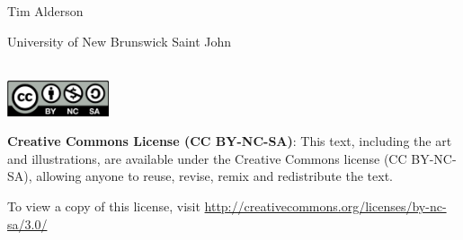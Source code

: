 \vspace{5em}

\noindent Tim Alderson

\noindent University of New Brunswick Saint John

\vfill


 \\

\noindent \includegraphics[width=3cm]{images/cc-by-nc-sa.eps}

\medskip

\noindent \textbf{Creative Commons License (CC BY-NC-SA)}: This text, including the art and illustrations, are available under the Creative Commons license (CC BY-NC-SA), allowing anyone to reuse, revise, remix and redistribute the text.  

\medskip

\noindent To view a copy of this license,
visit \href{http://creativecommons.org/licenses/by-nc-sa/3.0/}{http://creativecommons.org/licenses/by-nc-sa/3.0/}  

\setlength{\parskip}{\baselineskip}